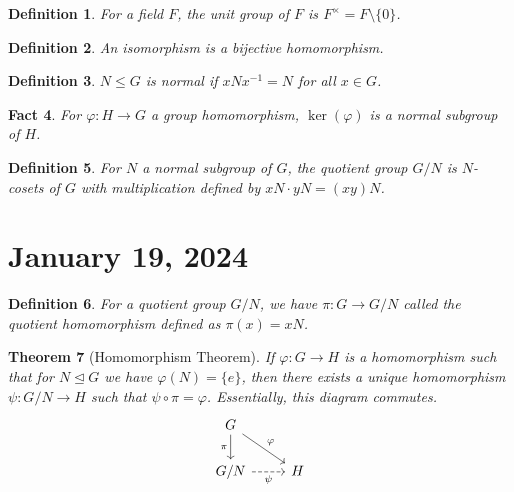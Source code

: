 \documentclass[a4paper,12pt]{article}
\theoremstyle{sltheorem}
\newtheorem{theorem}{Theorem}[section]
\newtheorem{definition}[theorem]{Definition}
\newtheorem{fact}[theorem]{Fact}
\begin{document}
\begin{definition}
    For a field $F$, the \textit{unit group} of $F$ is $F^{\times} = F \setminus \{0\}$.
\end{definition}

\begin{definition}
    An \textit{isomorphism} is a bijective homomorphism.
\end{definition}

\begin{definition}
    $N \leq G$ is \textit{normal} if $xNx^{-1} = N$ for all $x \in G$.
\end{definition}

\begin{fact}
    For $\varphi: H \rightarrow G$ a  group homomorphism, $\ker(\varphi)$ is a normal subgroup of $H$.
\end{fact}

\begin{definition}
    For $N$ a normal subgroup of $G$, the \textit{quotient group} $G/N$  is $N$-cosets of $G$ with multiplication defined by $xN \cdot yN = (xy)N$.
\end{definition}

\section{January 19, 2024}

\begin{definition}
    For a quotient group $G / N$, we have $\pi: G \rightarrow G / N$ called the \textit{quotient homomorphism} defined as $\pi(x) = xN$.
\end{definition}

\begin{theorem}[Homomorphism Theorem] If $\varphi: G \rightarrow H$ is a homomorphism such that for $N \trianglelefteq G$ we have $\varphi(N) = \{e \}$, then there exists a unique homomorphism $\psi: G/N \rightarrow H$ such that $\psi \circ \pi = \varphi$. Essentially, this diagram commutes.
\[\begin{tikzcd}
	G \\
	{G/N} & H
	\arrow["\pi"', from=1-1, to=2-1]
	\arrow["\psi"', dashed, from=2-1, to=2-2]
	\arrow["\varphi", from=1-1, to=2-2]
\end{tikzcd}\]
\end{theorem}
\end{document}
